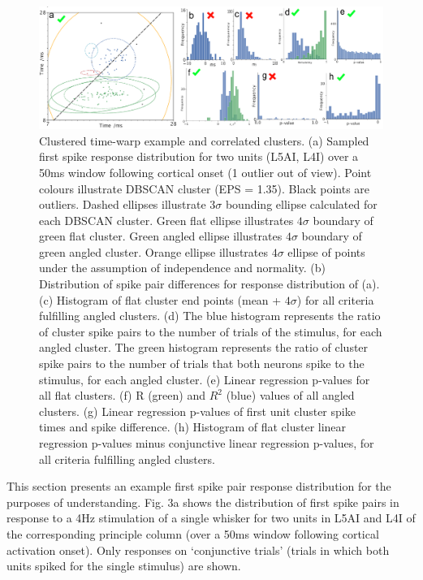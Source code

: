 \documentclass{article}
\begin{document}
\begin{figure}[t!]
\centering
\includegraphics[width=\textwidth]{Figure3.pdf}
\caption{Clustered time-warp example and correlated clusters. (a) Sampled first spike response distribution for two units (L5AI, L4I) over a 50ms window following cortical onset (1 outlier out of view). Point colours illustrate DBSCAN cluster (EPS = 1.35). Black points are outliers. Dashed ellipses illustrate $3\sigma$ bounding ellipse calculated for each DBSCAN cluster. Green flat ellipse illustrates $4\sigma$ boundary of green flat cluster. Green angled ellipse illustrates $4\sigma$ boundary of green angled cluster. Orange ellipse illustrates $4\sigma$ ellipse of points under the assumption of independence and normality. (b) Distribution of spike pair differences for response distribution of (a). (c) Histogram of flat cluster end points (mean + $4\sigma$) for all criteria fulfilling angled clusters. (d) The blue histogram represents the ratio of cluster spike pairs to the number of trials of the stimulus, for each angled cluster. The green histogram represents the ratio of cluster spike pairs to the number of trials that both neurons spike to the stimulus, for each angled cluster. (e) Linear regression p-values for all flat clusters. (f) R (green) and $R^2$ (blue) values of all angled clusters. (g) Linear regression p-values of first unit cluster spike times and spike difference. (h) Histogram of flat cluster linear regression p-values minus conjunctive linear regression p-values, for all criteria fulfilling angled clusters.}
\label{fig:fig3}
\end{figure}


This section presents an example first spike pair response distribution for the purposes of understanding. Fig. 3a shows the distribution of first spike pairs in response to a 4Hz stimulation of a single whisker for two units in L5AI and L4I of the corresponding principle column (over a 50ms window following cortical activation onset). Only responses on `conjunctive trials' (trials in which both units spiked for the single stimulus) are shown. 
\end{document}
